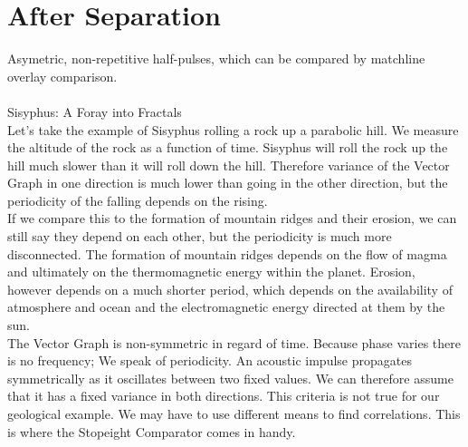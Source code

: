 \documentclass{report}
\begin{document}
\chapter{After Separation}
Asymetric, non-repetitive half-pulses, which can be compared by matchline overlay comparison.\\\\
Sisyphus: A Foray into Fractals\\
Let's take the example of Sisyphus rolling a rock up a parabolic hill. We measure the altitude of the rock as a function of time. Sisyphus will roll the rock up the hill much slower than it will roll down the hill. Therefore variance of the Vector Graph in one direction is much lower than going in the other direction, but the periodicity of the falling depends on the rising.\\
If we compare this to the formation of mountain ridges and their erosion, we can still say they depend on each other, but the periodicity is much more disconnected. The formation of mountain ridges depends on the flow of magma and ultimately on the thermomagnetic energy within the planet. Erosion, however depends on a much shorter period, which depends on the availability of atmosphere and ocean and the electromagnetic energy directed at them by the sun.\\
The Vector Graph is non-symmetric in regard of time. Because phase varies there is no frequency; We speak of periodicity. An acoustic impulse propagates symmetrically as it oscillates between two fixed values. We can therefore assume that it has a fixed variance in both directions. This criteria is not true for our geological example. We may have to use different means to find correlations. This is where the Stopeight Comparator comes in handy.\\


\iffalse
\printbibliography
\fi
{}

\end{document}
